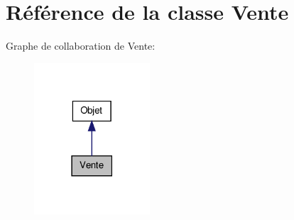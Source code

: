 \hypertarget{class_vente}{
\section{Référence de la classe Vente}
\label{d8/dd9/class_vente}
}


Graphe de collaboration de Vente:\nopagebreak
\begin{figure}[H]
\begin{center}
\leavevmode
\includegraphics[width=122pt]{d5/d5f/class_vente__coll__graph}
\end{center}
\end{figure}
